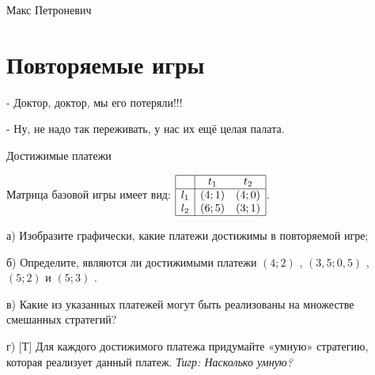 \begin{source}
Макс Петроневич
\end{source}




\section{Повторяемые игры}

- Доктор, доктор, мы его потеряли!!!

- Ну, не надо так переживать, у нас их ещё целая палата.



\begin{problem}
 Достижимые платежи\par
Матрица базовой игры имеет вид:  $\begin{array}{|c|cc|}  \hline {} & {t_{1} } & {t_{2} } \\  \hline {l_{1} } & {\left(4;1\right)} & {\left(4;0\right)} \\ {l_{2} } & {\left(6;5\right)} & {\left(3;1\right)} \\  \hline  \end{array}$.

а)      Изобразите графически, какие платежи достижимы в повторяемой игре;

б)      Определите, являются ли достижимыми платежи  $\left(4;2\right)$ ,  $\left(3,5;0,5\right)$ ,  $\left(5;2\right)$  и  $\left(5;3\right)$ .

в)      Какие из указанных платежей могут быть реализованы на множестве смешанных стратегий?

г) $[$Т$]$ Для каждого достижимого платежа придумайте «умную» стратегию, которая реализует данный платеж. {\it Тигр: Насколько умную?}



\begin{sol}

\end{sol}
\end{problem}



